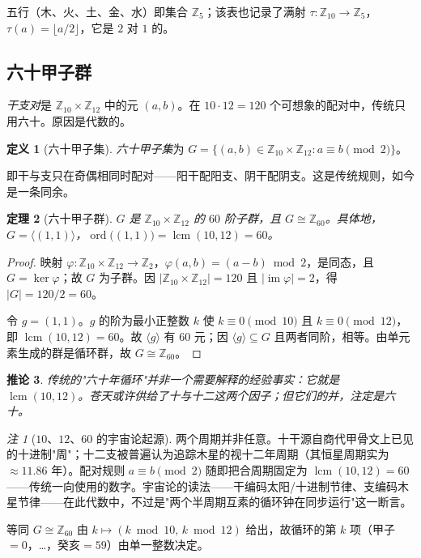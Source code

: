 \documentclass[11pt,a4paper,fontset=none]{ctexart}
\newtheorem{theorem}{定理}[section]
\newtheorem{corollary}[theorem]{推论}
\theoremstyle{definition}
\newtheorem{definition}[theorem]{定义}
\theoremstyle{remark}
\newtheorem*{remark}{注}
\DeclareMathOperator{\lcm}{lcm}
\newcommand{\Z}{\mathbb{Z}}
\newcommand{\ord}{\operatorname{ord}}
\begin{document}
五行（木、火、土、金、水）即集合 $\Z_5$；该表也记录了满射 $\tau:\Z_{10}\to\Z_5$，$\tau(a)=\lfloor a/2\rfloor$，它是 $2$ 对 $1$ 的。

\subsection{六十甲子群}
\emph{干支对}是 $\Z_{10}\times\Z_{12}$ 中的元 $(a,b)$。在 $10\cdot 12=120$ 个可想象的配对中，传统只用六十。原因是代数的。
\begin{definition}[六十甲子集]
\emph{六十甲子集}为 $G=\{(a,b)\in\Z_{10}\times\Z_{12}:a\equiv b\pmod 2\}$。
\end{definition}
即干与支只在奇偶相同时配对——阳干配阳支、阴干配阴支。这是传统规则，如今是一条同余。

\begin{theorem}[六十甲子群]\label{thm:sexagenary}
$G$ 是 $\Z_{10}\times\Z_{12}$ 的 $60$ 阶子群，且 $G\cong\Z_{60}$。具体地，$G=\langle(1,1)\rangle$，$\ord\big((1,1)\big)=\lcm(10,12)=60$。
\end{theorem}
\begin{proof}
映射 $\varphi:\Z_{10}\times\Z_{12}\to\Z_2$，$\varphi(a,b)=(a-b)\bmod 2$，是同态，且 $G=\ker\varphi$；故 $G$ 为子群。因 $|\Z_{10}\times\Z_{12}|=120$ 且 $|\operatorname{im}\varphi|=2$，得 $|G|=120/2=60$。

令 $g=(1,1)$。$g$ 的阶为最小正整数 $k$ 使 $k\equiv0\pmod{10}$ 且 $k\equiv0\pmod{12}$，即 $\lcm(10,12)=60$。故 $\langle g\rangle$ 有 $60$ 元；因 $\langle g\rangle\subseteq G$ 且两者同阶，相等。由单元素生成的群是循环群，故 $G\cong\Z_{60}$。
\end{proof}

\begin{corollary}
传统的"六十年循环"并非一个需要解释的经验事实：它就是 $\lcm(10,12)$。苍天或许供给了十与十二这两个因子；但它们的并，注定是六十。
\end{corollary}

\begin{remark}[$10$、$12$、$60$ 的宇宙论起源]
两个周期并非任意。十干源自商代甲骨文上已见的十进制"周"；十二支被普遍认为追踪木星的视十二年周期（其恒星周期实为 $\approx11.86$ 年）。配对规则 $a\equiv b\pmod2$ 随即把合周期固定为 $\lcm(10,12)=60$——传统一向使用的数字。宇宙论的读法——干编码太阳/十进制节律、支编码木星节律——在此代数中，不过是"两个半周期互素的循环钟在同步运行"这一断言。
\end{remark}

等同 $G\cong\Z_{60}$ 由 $k\mapsto(k\bmod 10,\,k\bmod 12)$ 给出，故循环的第 $k$ 项（甲子$=0$，\dots，癸亥$=59$）由单一整数决定。
\end{document}
